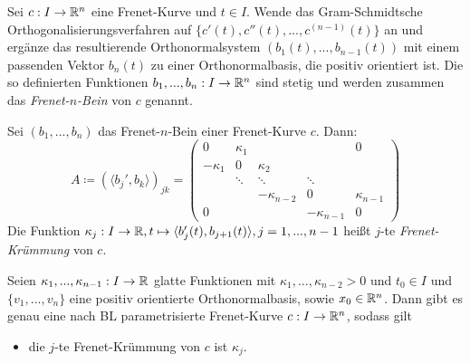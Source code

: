 \documentclass{cheat-sheet}
\begin{document}
\begin{defn}
  Sei $c : I \to \mathbb{R}^n$ eine Frenet-Kurve und $t \in I$. Wende das Gram-Schmidtsche Orthogonalisierungsverfahren auf $\{ c'(t), c''(t), ..., c^{(n-1)}(t) \}$ an und ergänze das resultierende Orthonormalsystem $(b_1(t), ..., b_{n-1}(t))$ mit einem passenden Vektor $b_n(t)$ zu einer Orthonormalbasis, die positiv orientiert ist. Die so definierten Funktionen $b_1, ..., b_n : I \to \mathbb{R}^n$ sind stetig und werden zusammen das \emph{Frenet-$n$-Bein} von $c$ genannt.
\end{defn}

\begin{defn}
  Sei $(b_1, ..., b_n)$ das Frenet-$n$-Bein einer Frenet-Kurve $c$. Dann:
  \[ A \coloneqq (\langle b_j' , b_k \rangle)_{jk} = \begin{pmatrix}
    0 & \kappa_1 &&& 0 \\
    - \kappa_1 & 0 & \kappa_2 \\
    & \ddots & \ddots & \ddots \\
    && - \kappa_{n-2} & 0 & \kappa_{n-1} \\
    0 &&& - \kappa_{n-1} & 0
  \end{pmatrix} \]
  Die Funktion $\kappa_j : I \to \mathbb{R}, t \mapsto \langle b_j'(t) , b_{j+1}(t) \rangle, j = 1, ..., n - 1$ heißt $j$-te \emph{Frenet-Krümmung} von $c$.
\end{defn}


\begin{satz}
  Seien $\kappa_1, ..., \kappa_{n-1} : I \to \mathbb{R}$ glatte Funktionen mit $\kappa_1, ..., \kappa_{n-2} > 0$ und $t_0 \in I$ und $\{ v_1, ..., v_n \}$ eine positiv orientierte Orthonormalbasis, sowie $x_0 \in \mathbb{R}^n$. Dann gibt es genau eine nach BL parametrisierte Frenet-Kurve $c : I \to \mathbb{R}^n$, sodass gilt
  \begin{itemize}
    \item die $j$-te Frenet-Krümmung von $c$ ist $\kappa_j$.
  \end{itemize}
\end{satz}
\end{document}
